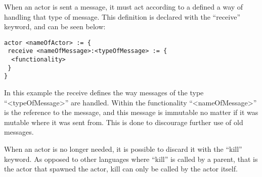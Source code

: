 
When an actor is sent a message, it must act according to a defined a way of handling that type of message. This definition is declared with the \enquote{receive} keyword, and can be seen below:

\label{actorfuncReceive}
\begin{lstlisting}
actor <nameOfActor> := {
 receive <nameOfMessage>:<typeOfMessage> := {
  <functionality>
 }
}
\end{lstlisting}

In this example the receive defines the way messages of the type \enquote{<typeOfMessage>} are handled. Within the functionality \enquote{<nameOfMessage>} is the reference to the message, and this message is immutable no matter if it was mutable where it was sent from. This is done to discourage further use of old messages.

When an actor is no longer needed, it is possible to discard it with the \enquote{kill} keyword. As opposed to other languages where \enquote{kill} is called by a parent, that is the actor that spawned the actor, kill can only be called by the actor itself. 
